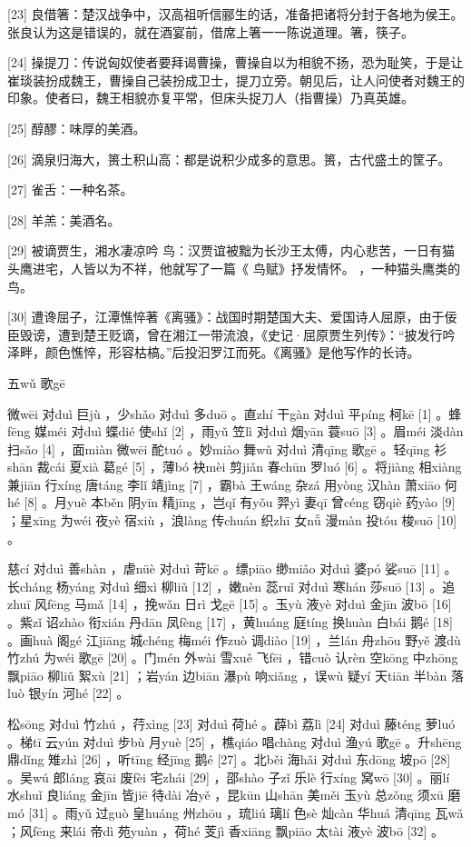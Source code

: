\documentclass[12pt,UTF8]{ctexbook}
\begin{document}
[23] 良借箸：楚汉战争中，汉高祖听信郦生的话，准备把诸将分封于各地为侯王。张良认为这是错误的，就在酒宴前，借席上箸一一陈说道理。箸，筷子。

[24] 操提刀：传说匈奴使者要拜谒曹操，曹操自以为相貌不扬，恐为耻笑，于是让崔琰装扮成魏王，曹操自己装扮成卫士，提刀立旁。朝见后，让人问使者对魏王的印象。使者曰，魏王相貌亦复平常，但床头捉刀人（指曹操）乃真英雄。

[25] 醇醪：味厚的美酒。

[26] 滴泉归海大，篑土积山高：都是说积少成多的意思。篑，古代盛土的筐子。

[27] 雀舌：一种名茶。

[28] 羊羔：美酒名。

[29] 被谪贾生，湘水凄凉吟 鸟：汉贾谊被黜为长沙王太傅，内心悲苦，一日有猫头鹰进宅，人皆以为不祥，他就写了一篇《 鸟赋》抒发情怀。 ，一种猫头鹰类的鸟。

[30] 遭谗屈子，江潭憔悴著《离骚》：战国时期楚国大夫、爱国诗人屈原，由于佞臣毁谤，遭到楚王贬谪，曾在湘江一带流浪，《史记·屈原贾生列传》：“披发行吟泽畔，颜色憔悴，形容枯槁。”后投汩罗江而死。《离骚》是他写作的长诗。





五wǔ 歌gē


微wēi 对duì 巨jù ，少shǎo 对duì 多duō 。直zhí 干gàn 对duì 平píng 柯kē [1] 。蜂fēng 媒méi 对duì 蝶dié 使shǐ [2] ，雨yǔ 笠lì 对duì 烟yān 蓑suō [3] 。眉méi 淡dàn 扫sǎo [4] ，面miàn 微wēi 酡tuó 。妙miào 舞wǔ 对duì 清qīng 歌gē 。轻qīng 衫shān 裁cái 夏xià 葛gé [5] ，薄bó 袂mèi 剪jiǎn 春chūn 罗luó [6] 。将jiàng 相xiàng 兼jiān 行xíng 唐táng 李lǐ 靖jìng [7] ，霸bà 王wáng 杂zá 用yòng 汉hàn 萧xiāo 何hé [8] 。月yuè 本běn 阴yīn 精jīng ，岂qǐ 有yǒu 羿yì 妻qī 曾céng 窃qiè 药yào [9] ；星xīng 为wéi 夜yè 宿xiù ，浪làng 传chuán 织zhī 女nǚ 漫màn 投tóu 梭suō [10] 。

慈cí 对duì 善shàn ，虐nüè 对duì 苛kē 。缥piāo 缈miǎo 对duì 婆pó 娑suō [11] 。长cháng 杨yáng 对duì 细xì 柳liǔ [12] ，嫩nèn 蕊ruǐ 对duì 寒hán 莎suō [13] 。追zhuī 风fēng 马mǎ [14] ，挽wǎn 日rì 戈gē [15] 。玉yù 液yè 对duì 金jīn 波bō [16] 。紫zǐ 诏zhào 衔xián 丹dān 凤fèng [17] ，黄huáng 庭tíng 换huàn 白bái 鹅é [18] 。画huà 阁gé 江jiāng 城chéng 梅méi 作zuò 调diào [19] ，兰lán 舟zhōu 野yě 渡dù 竹zhú 为wéi 歌gē [20] 。门mén 外wài 雪xuě 飞fēi ，错cuò 认rèn 空kōng 中zhōng 飘piāo 柳liǔ 絮xù [21] ；岩yán 边biān 瀑pù 响xiǎng ，误wù 疑yí 天tiān 半bàn 落luò 银yín 河hé [22] 。

松sōng 对duì 竹zhú ，荇xìng [23] 对duì 荷hé 。薜bì 荔lì [24] 对duì 藤téng 萝luó 。梯tī 云yún 对duì 步bù 月yuè [25] ，樵qiáo 唱chàng 对duì 渔yú 歌gē 。升shēng 鼎dǐng 雉zhì [26] ，听tīng 经jīng 鹅é [27] 。北běi 海hǎi 对duì 东dōng 坡pō [28] 。吴wú 郎láng 哀āi 废fèi 宅zhái [29] ，邵shào 子zǐ 乐lè 行xíng 窝wō [30] 。丽lí 水shuǐ 良liáng 金jīn 皆jiē 待dài 冶yě ，昆kūn 山shān 美měi 玉yù 总zǒng 须xū 磨mó [31] 。雨yǔ 过guò 皇huáng 州zhōu ，琉liú 璃lí 色sè 灿càn 华huá 清qīng 瓦wǎ ；风fēng 来lái 帝dì 苑yuàn ，荷hé 芰jì 香xiāng 飘piāo 太tài 液yè 波bō [32] 。
\end{document}
